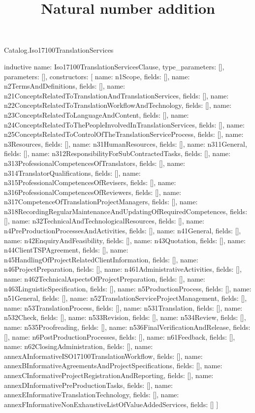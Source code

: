 \begin{lexlean}{Catalog.Iso17100TranslationServices}
\title{Natural number addition}
\begin{semanticmodule}
inductive{
  name: Iso17100TranslationServicesClause,
  type_parameters: [],
  parameters: [],
  constructors: [
    {name: n1Scope, fields: []},
    {name: n2TermsAndDefinitions, fields: []},
    {name: n21ConceptsRelatedToTranslationAndTranslationServices, fields: []},
    {name: n22ConceptsRelatedToTranslationWorkflowAndTechnology, fields: []},
    {name: n23ConceptsRelatedToLanguageAndContent, fields: []},
    {name: n24ConceptsRelatedToThePeopleInvolvedInTranslationServices, fields: []},
    {name: n25ConceptsRelatedToControlOfTheTranslationServiceProcess, fields: []},
    {name: n3Resources, fields: []},
    {name: n31HumanResources, fields: []},
    {name: n311General, fields: []},
    {name: n312ResponsibilityForSubContractedTasks, fields: []},
    {name: n313ProfessionalCompetencesOfTranslators, fields: []},
    {name: n314TranslatorQualifications, fields: []},
    {name: n315ProfessionalCompetencesOfRevisers, fields: []},
    {name: n316ProfessionalCompetencesOfReviewers, fields: []},
    {name: n317CompetenceOfTranslationProjectManagers, fields: []},
    {name: n318RecordingRegularMaintenanceAndUpdatingOfRequiredCompetences, fields: []},
    {name: n32TechnicalAndTechnologicalResources, fields: []},
    {name: n4PreProductionProcessesAndActivities, fields: []},
    {name: n41General, fields: []},
    {name: n42EnquiryAndFeasibility, fields: []},
    {name: n43Quotation, fields: []},
    {name: n44ClientTSPAgreement, fields: []},
    {name: n45HandlingOfProjectRelatedClientInformation, fields: []},
    {name: n46ProjectPreparation, fields: []},
    {name: n461AdministrativeActivities, fields: []},
    {name: n462TechnicalAspectsOfProjectPreparation, fields: []},
    {name: n463LinguisticSpecification, fields: []},
    {name: n5ProductionProcess, fields: []},
    {name: n51General, fields: []},
    {name: n52TranslationServiceProjectManagement, fields: []},
    {name: n53TranslationProcess, fields: []},
    {name: n531Translation, fields: []},
    {name: n532Check, fields: []},
    {name: n533Revision, fields: []},
    {name: n534Review, fields: []},
    {name: n535Proofreading, fields: []},
    {name: n536FinalVerificationAndRelease, fields: []},
    {name: n6PostProductionProcesses, fields: []},
    {name: n61Feedback, fields: []},
    {name: n62ClosingAdministration, fields: []},
    {name: annexAInformativeISO17100TranslationWorkflow, fields: []},
    {name: annexBInformativeAgreementsAndProjectSpecifications, fields: []},
    {name: annexCInformativeProjectRegistrationAndReporting, fields: []},
    {name: annexDInformativePreProductionTasks, fields: []},
    {name: annexEInformativeTranslationTechnology, fields: []},
    {name: annexFInformativeNonExhaustiveListOfValueAddedServices, fields: []}
  ]
}


\end{semanticmodule}
\end{lexlean}
